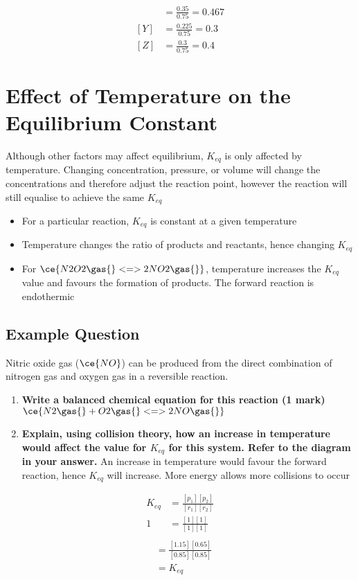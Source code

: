 	\begin{align*}
		[X] &= \frac{0.35}{0.75} = 0.467 \\
		[Y] &= \frac{0.225}{0.75} = 0.3 \\
		[Z] &= \frac{0.3}{0.75} = 0.4
	\end{align*}
	
\section{Effect of Temperature on the Equilibrium Constant} \label{8/11/2024}
	Although other factors may affect equilibrium, $K_{eq}$ is only affected by temperature.
	Changing concentration, pressure, or volume will change the concentrations and therefore adjust the reaction point, however the reaction will still equalise to achieve the same $K_{eq}$

	\begin{itemize}
		\item For a particular reaction, $K_{eq}$ is constant at a given temperature
		\item Temperature changes the ratio of products and reactants, hence changing $K_{eq}$
		\item For $\ce{N2O2 \gas{} <=> 2NO2 \gas{}}$, temperature increases the $K_{eq}$ value and favours the formation of products. The forward reaction is endothermic
	\end{itemize}

	\subsection{Example Question}
		Nitric oxide gas ($\ce{NO}$) can be produced from the direct combination of nitrogen gas and oxygen gas in a reversible reaction.
		\begin{enumerate}
			\item \textbf{Write a balanced chemical equation for this reaction (1 mark)}
				\subitem $\ce{N2 \gas{} + O2 \gas{} <=> 2NO \gas{}}$
			\item \textbf{Explain, using collision theory, how an increase in temperature would affect the value for $K_{eq}$ for this system. Refer to the diagram in your answer.}
				\subitem An increase in temperature would favour the forward reaction, hence $K_{eq}$ will increase. More energy allows more collisions to occur
		\end{enumerate}
	
		\begin{align*}
			K_{eq} &= \frac{[p_1][p_2]}{[r_1][r_2]} \\
			1 &= \frac{[1][1]}{[1][1]} \\
		\end{align*}
		\begin{align*}
			&= \frac{[1.15][0.65]}{[0.85][0.85]} \\
			&=K_{eq}
		\end{align*}

